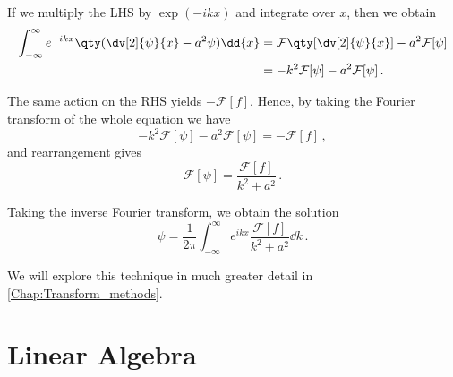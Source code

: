\documentclass{article}
\theoremstyle{plain}\theoremheaderfont{\normalfont\itshape}\theorembodyfont{\rmfamily}\theoremseparator{.}\newtheorem*{rem}{Remark}\newtheorem*{ex}{Example}\newtheorem*{proof}{Proof}\newtheorem*{altp}{Alternative proof}
\theoremstyle{plain}\theoremheaderfont{\normalfont\bfseries}\theorembodyfont{\rmfamily}\theoremseparator{.}\newtheorem{thm}{Theorem}[section]\newtheorem{lem}[thm]{Lemma}\newtheorem{prop}[thm]{Proposition}\newtheorem*{cor}{Corollary}\newtheorem{defn}[thm]{Definition}\newtheorem{clm}[thm]{Claim}\newtheorem{clminproof}{Claim}
\theoremstyle{break}\theoremheaderfont{\normalfont\itshape}\theorembodyfont{\rmfamily}\theoremseparator{.\medskip}\newtheorem*{proofskip}{Proof}\newtheorem*{exs}{Examples}\newtheorem*{rems}{Remarks}
\theoremstyle{break}\theoremheaderfont{\normalfont\bfseries}\theorembodyfont{\rmfamily}\theoremseparator{.\medskip}\newtheorem{lemskip}[thm]{Lemma}\newtheorem{defnskip}[thm]{Definition}\newtheorem{propskip}[thm]{Proposition}\newtheorem{thmskip}[thm]{Theorem}
\numberwithin{equation}{section}
\begin{document}
	If we multiply the LHS by \(\exp(-ikx)\) and integrate over \(x\), then we obtain
	\begin{align*}
		\int_{-\infty}^{\infty}e^{-ikx}\qty(\dv[2]{\psi}{x}-a^2\psi)\dd{x}&=\mathcal{F}\qty[\dv[2]{\psi}{x}]-a^2\mathcal{F}[\psi]\\
		&=-k^2\mathcal{F}[\psi]-a^2\mathcal{F}[\psi]\,.
	\end{align*}
	
	The same action on the RHS yields \(-\mathcal{F}[f]\). Hence, by taking the Fourier transform of the whole equation we have
	\[-k^2\mathcal{F}[\psi]-a^2\mathcal{F}[\psi]=-\mathcal{F}[f]\,,\]
	and rearrangement gives
	\[\mathcal{F}[\psi]=\frac{\mathcal{F}[f]}{k^2+a^2}\,.\]
	
	Taking the inverse Fourier transform, we obtain the solution
	\[\psi=\frac{1}{2\pi}\int_{-\infty}^{\infty}e^{ikx}\frac{\mathcal{F}[f]}{k^2+a^2}\dd{k}\,.\]

	We will explore this technique in much greater detail in \cref{Chap:Transform_methods}.
	
	\newpage
	
	\section{Linear Algebra}
\end{document}
